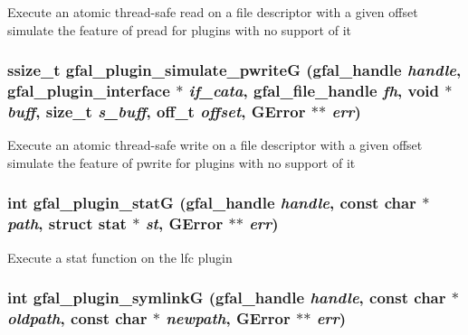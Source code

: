 Execute an atomic thread-safe read on a file descriptor with a given offset simulate the feature of pread for plugins with no support of it 
\subsubsection{\setlength{\rightskip}{0pt plus 5cm}ssize\_\-t gfal\_\-plugin\_\-simulate\_\-pwrite\-G (gfal\_\-handle {\em handle}, \bf{gfal\_\-plugin\_\-interface} $\ast$ {\em if\_\-cata}, gfal\_\-file\_\-handle {\em fh}, void $\ast$ {\em buff}, size\_\-t {\em s\_\-buff}, off\_\-t {\em offset}, GError $\ast$$\ast$ {\em err})\hspace{0.3cm}{\tt  [inline]}}\label{gfal__common__plugin_8c_418dcc57eb6359902128ec734791f938}


Execute an atomic thread-safe write on a file descriptor with a given offset simulate the feature of pwrite for plugins with no support of it 
\subsubsection{\setlength{\rightskip}{0pt plus 5cm}int gfal\_\-plugin\_\-stat\-G (gfal\_\-handle {\em handle}, const char $\ast$ {\em path}, struct stat $\ast$ {\em st}, GError $\ast$$\ast$ {\em err})}\label{gfal__common__plugin_8c_98b9e43ecd18ce2fc728d4a731e52ce1}


Execute a stat function on the lfc plugin 
\subsubsection{\setlength{\rightskip}{0pt plus 5cm}int gfal\_\-plugin\_\-symlink\-G (gfal\_\-handle {\em handle}, const char $\ast$ {\em oldpath}, const char $\ast$ {\em newpath}, GError $\ast$$\ast$ {\em err})}\label{gfal__common__plugin_8c_6ff9d39b564be7d0a560a09288e19b9e}


